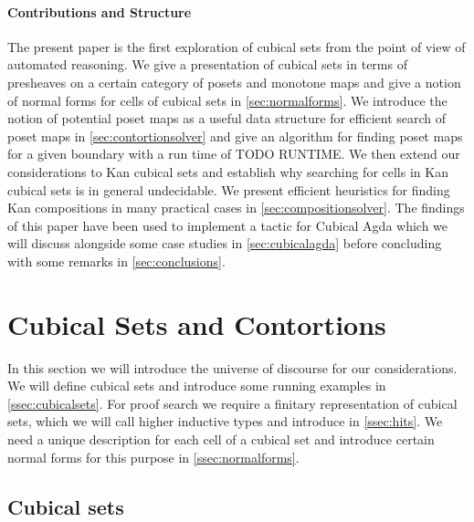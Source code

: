 \documentclass[11pt]{article}
\theoremstyle{definition}
\begin{document}



\paragraph*{Contributions and Structure}

The present paper is the first exploration of cubical sets from the point of
view of automated reasoning. We give a presentation of cubical sets in terms of
presheaves on a certain category of posets and monotone maps and give a notion
of normal forms for cells of cubical sets in \autoref{sec:normalforms}. We
introduce the notion of potential poset maps as a useful data structure for
efficient search of poset maps in \autoref{sec:contortionsolver} and give an
algorithm for finding poset maps for a given boundary with a run time of TODO RUNTIME.
We then extend our considerations to Kan cubical sets and establish why searching for
cells in Kan cubical sets is in general undecidable. We present efficient heuristics for
finding Kan compositions in many practical cases in
\autoref{sec:compositionsolver}. The findings of this paper have been used to
implement a tactic for Cubical Agda which we will discuss alongside some case studies in
\autoref{sec:cubicalagda} before concluding with some remarks in
\autoref{sec:conclusions}.


\section{Cubical Sets and Contortions}
\label{sec:normalforms}

In this section we will introduce the universe of discourse for our
considerations. We will define cubical sets and introduce some running examples
in \autoref{ssec:cubicalsets}. For proof search we require a finitary
representation of cubical sets, which we will call higher inductive types and
introduce in \autoref{ssec:hits}. We need a unique description for each cell of
a cubical set and introduce certain normal forms for this purpose in
\autoref{ssec:normalforms}.

\subsection{Cubical sets}
\label{ssec:cubicalsets}
\end{document}
